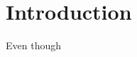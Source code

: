 \documentclass[Bachelorarbeit.tex]{subfiles}
\begin{document}
\newpage
\section{Introduction}
\label{Introduction}

Even though 


\FloatBarrier
\end{document}
